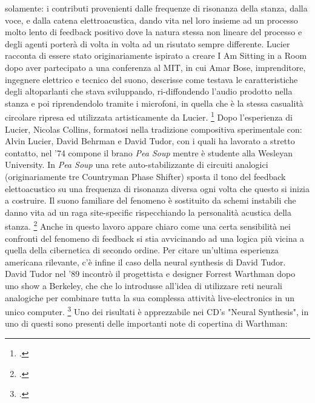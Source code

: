 solamente: i contributi provenienti dalle frequenze di risonanza della stanza,
dalla voce, e dalla catena elettroacustica,
dando vita nel loro insieme ad un processo molto lento di feedback positivo dove
la natura stessa non lineare del processo e degli agenti porterà di volta in volta ad un risutato
sempre differente.
Lucier racconta di essere stato originariamente ispirato
a creare I Am Sitting in a Room dopo aver partecipato a una conferenza al MIT,
in cui Amar Bose, imprenditore, ingegnere elettrico e tecnico del suono,
descrisse come testava le caratteristiche degli altoparlanti
che stava sviluppando, ri-diffondendo l'audio prodotto nella stanza e poi
riprendendolo tramite i microfoni, in quella che è la stessa casualità
circolare ripresa ed utilizzata artisticamente da Lucier. \footcite{lucierbose} 
Dopo l'esperienza di Lucier, Nicolas Collins,
formatosi nella tradizione compositiva sperimentale con: Alvin Lucier,
David Behrman e David Tudor, con i quali ha lavorato a stretto contatto,
nel '74 compone il brano \textit{Pea Soup} mentre è studente alla Wesleyan University.
In \textit{Pea Soup} una rete auto-stabilizzante di circuiti analogici
(originariamente tre Countryman Phase Shifter)
sposta il tono del feedback elettoacustico su una frequenza di risonanza
diversa ogni volta che questo si inizia a
costruire. Il suono familiare del fenomeno è sostituito da schemi instabili
che danno vita ad un raga site-specific
rispecchiando la personalità acustica della stanza. \footcite{collinspeasouphist}
Anche in questo lavoro appare chiaro come una certa sensibilità
nei confronti del fenomeno di feedback si stia avvicinando ad una logica più vicina
a quella della cibernetica di secondo ordine.
Per citare un'ultima esperienza americana rilevante,
c'è infine il caso della neural synthesis di David Tudor.
David Tudor nel '89 incontrò il progettista e designer Forrest Warthman
dopo uno show a Berkeley,
che che lo introdusse all'idea di utilizzare reti neurali analogiche
per combinare tutta la sua complessa attività live-electronics in un unico computer.
\footcite{tudorneuralsynth}
Uno dei risultati è apprezzabile nei CD's "Neural Synthesis", 
in uno di questi sono presenti delle importanti note di copertina di Warthman:

